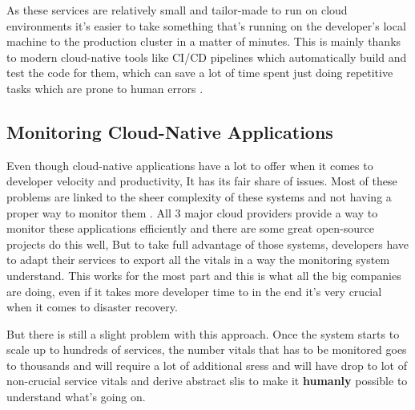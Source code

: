 As these services are relatively small and tailor-made to run on cloud environments it's easier to take something that's running on the developer's local machine to the production cluster in a matter of minutes. This is mainly thanks to modern cloud-native tools like CI/CD pipelines which automatically build and test the code for them, which can save a lot of time spent just doing repetitive tasks which are prone to human errors \citep{Whataret68:online}.

\subsection{Monitoring Cloud-Native Applications} \label{monitoring-bg}
Even though cloud-native applications have a lot to offer when it comes to developer velocity and productivity, It has its fair share of issues. Most of these problems are linked to the sheer complexity of these systems and not having a proper way to monitor them \citep{5WaysYou35:online}. All 3 major cloud providers provide a way to monitor these applications efficiently and there are some great open-source projects do this well, But to take full advantage of those systems, developers have to adapt their services to export all the vitals in a way the monitoring system understand. This works for the most part and this is what all the big companies are doing, even if it takes more developer time to in the end it's very crucial when it comes to disaster recovery.

But there is still a slight problem with this approach. Once the system starts to scale up to hundreds of services, the number vitals that has to be monitored goes to thousands and will require a lot of additional \acp{sres} and will have drop to lot of non-crucial service vitals and derive abstract \acp{sli} to make it \textbf{humanly} possible to understand what's going on.\\
